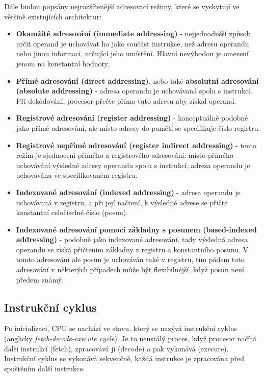 Dále budou popsány nejrozšířenější adresovací režimy, které se vyskytují ve většině existujících
architektur:\cite{tanenbaum}

\begin{itemize}
    \item \textbf{Okamžité adresování (immediate addressing)} - nejjednodušší způsob určit operand
        je uchovávat ho jako součást instrukce, než adresu operandu nebo jinou informaci, určující
        jeho umístění. Hlavní nevýhodou je omezení jenom na konstantní hodnoty.
    \item \textbf{Přímé adresování (direct addressing)}, nebo také \textbf{absolutní adresování
        (absolute addressing)} - adresa operandu je uchovávaná spolu s instrukcí. Při dekódování,
        procesor přečte přímo tuto adresu aby získal operand.
    \item \textbf{Registrové adresování (register addressing)} - konceptuálně podobné jako
        přímé adresování, ale místo adresy do pamětí se specifikuje číslo registru.
    \item \textbf{Registrové nepřímé adresování (register indirect addressing)} - tento režim
        je sjednocení přímého a registrového adresování: místo přímého uchovávání výsledné adresy
        operandu spolu s instrukcí, adresa operandu je uchovávána ve specifikovaném registru.
    \item \textbf{Indexované adresování (indexed addressing)} - adresa operandu je uchovávaná v
        registru, a při její načtení, k výsledné adrese se přičte konstantní celočíselné číslo
        (posun).
    \item \textbf{Indexované adresování pomocí základny s posunem (based-indexed addressing)} -
        podobně jako indexované adresování, tady výsledná adresa operandu se získá přičtením
        základny z registru a konstantního posunu. V tomto adresování ale posun je uchováván také
        v registru, tím pádem toto adresování v některých případech může být flexibilnější, když
        posun není předem známý.
\end{itemize}

\label{subsec:tp-instruction-cycle}
\subsection{Instrukční cyklus}

Po inicializaci, CPU se nachází ve stavu, který se nazývá instrukční cyklus (anglicky
\emph{fetch-decode-execute cycle}). Je to neustálý proces, když procesor načítá další instrukcí
(fetch), zpracovává jí (decode) a pak vykonává (execute). Instrukční cyklus se vykonává sekvenčně,
každá instrukce je zpracována před spuštěním další instrukce.

